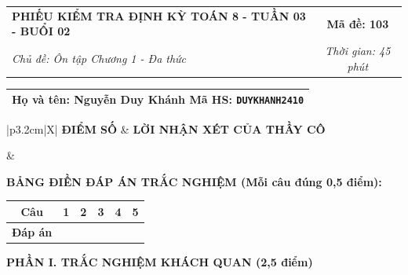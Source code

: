 \documentclass[12pt,a4paper]{article}
\begin{document}
\newpage


\noindent
\begin{tabularx}{\linewidth}{|X|c|}
\hline
\textbf{PHIẾU KIỂM TRA ĐỊNH KỲ TOÁN 8 - TUẦN 03 - BUỔI 02} & \textbf{Mã đề: 103} \\
\textit{Chủ đề: Ôn tập Chương 1 - Đa thức} & \textit{Thời gian: 45 phút} \\
\hline
\end{tabularx}

\vspace{1mm}

\noindent
\begin{tabularx}{\linewidth}{|X|}
\hline
\rule[-2mm]{0pt}{7.5mm}\textbf{Họ và tên:} \textbf{\large Nguyễn Duy Khánh} \hfill \textbf{Mã HS:} \texttt{DUYKHANH2410} \quad \\
\hline
\end{tabularx}

\vspace{1mm}

\noindent
\begin{tabularx}{\linewidth}{|p{3.2cm}|X|}
\hline
\centering\textbf{ĐIỂM SỐ} & \centering\textbf{LỜI NHẬN XÉT CỦA THẦY CÔ} \tabularnewline
\hline
\rule{0pt}{1.3cm} & \tabularnewline
\hline
\end{tabularx}

\vspace{1.2mm}

\noindent\textbf{BẢNG ĐIỀN ĐÁP ÁN TRẮC NGHIỆM (Mỗi câu đúng 0,5 điểm):}
\vspace{0.8mm}

\noindent
\renewcommand{\arraystretch}{1.35}
\begin{tabularx}{\linewidth}{|c|*{5}{>{\centering\arraybackslash}X|}}
\hline
\textbf{Câu} & \textbf{1} & \textbf{2} & \textbf{3} & \textbf{4} & \textbf{5} \\
\hline
\textbf{Đáp án} & & & & & \\
\hline
\end{tabularx}
\renewcommand{\arraystretch}{1.0}

\vspace{1.5mm}

\noindent\textbf{\large PHẦN I. TRẮC NGHIỆM KHÁCH QUAN (2,5 điểm)}
\vspace{1mm}
\end{document}
